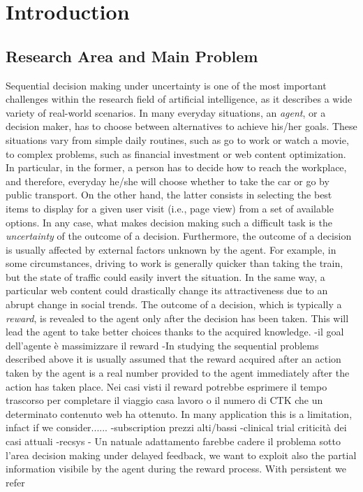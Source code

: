 \chapter{Introduction}


\section{Research Area and Main Problem}


Sequential decision making under uncertainty is one of the most important challenges within the research field of artificial intelligence, as it describes a wide variety of real-world scenarios. In many everyday situations, an \emph{agent}, or a decision maker, has to choose between alternatives to achieve his/her goals. These situations vary from simple daily routines, such as go to work or watch a movie, to complex problems, such as financial investment or web content optimization. In particular, in the former, a person has to decide how to reach the workplace, and therefore, everyday he/she will choose whether to take the car or go by public transport. On the other hand, the latter consists in selecting the best items to display for a given user visit (i.e., page view) from a set of available options. In any case, what makes decision making such a difficult task is the \emph{uncertainty} of the outcome of a decision. Furthermore, the outcome of a decision is usually affected by external factors unknown by the agent.
For example, in some circumstances, driving to work is generally quicker than taking the train, but the state of traffic could easily invert the situation. In the same way, a particular web content could drastically change its attractiveness due to an abrupt change in social trends. The outcome of a decision, which is typically a \emph{reward}, is revealed to the agent only after the decision has been taken. This will lead the agent to take better choices thanks to the acquired knowledge.
-il goal dell'agente è massimizzare il reward
-In studying the sequential problems described above it is usually assumed that the reward acquired after an action taken by the agent is a real number provided to the agent immediately after the action has taken place. Nei casi visti il reward potrebbe esprimere il tempo trascorso per completare il viaggio casa lavoro o il numero di CTK che un determinato contenuto web ha ottenuto. In many application this is a limitation, infact if we consider......
-subscription prezzi alti/bassi
-clinical trial criticità dei casi attuali
-recsys
- Un natuale adattamento farebbe cadere il problema sotto l'area decision making under delayed feedback, we want to exploit also the partial information visibile by the agent during the reward process. With persistent we refer


